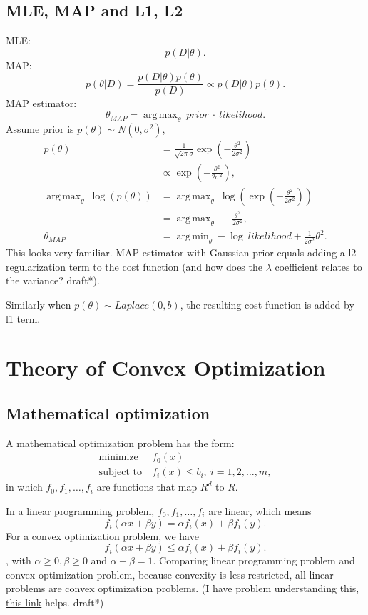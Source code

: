 \documentclass{report}
\DeclareMathOperator*{\argmax}{arg\,max}
\DeclareMathOperator*{\argmin}{arg\,min}
\begin{document}
\section{MLE, MAP and L1, L2}
MLE: \[
	p(D|\theta)
.\] 
MAP:
\[
	p(\theta|D) = \frac{p(D|\theta)p(\theta)}{p(D)} \propto p(D|\theta)p(\theta)
.\] 
MAP estimator: \[
	\theta_{MAP} = \argmax_{\theta}\ prior\ \cdot\ likelihood
.\] 
Assume prior is $p(\theta) \sim N(0, \sigma^2)$,
\begin{align*}
	p(\theta) &= \frac{1}{\sqrt{2\pi} \sigma} \exp \left( -\frac{\theta^2}{2\sigma^2} \right) \\
		  &\propto \exp \left( -\frac{
		  \theta^2}{2\sigma^2} \right), \\
		  \argmax_{\theta}\ \log(p(\theta)) &= \argmax_{\theta}\ \log \left( \exp \left( -\frac{\theta^2}{2\sigma^2} \right) \right) \\ 
 &= \argmax_{\theta}\ -\frac{\theta^2}{2\sigma^2}, \\
		  \theta_{MAP} &= \argmin_{\theta} - \log \ likelihood +  \frac{1}{2\sigma^2} \theta^2
.\end{align*}
This looks very familiar. MAP estimator with Gaussian prior equals adding a l2 regularization term to the cost function (and how does the $\lambda$ coefficient relates to the variance? draft*).

Similarly when $p(\theta) \sim Laplace(0, b)$, the resulting cost function is added by l1 term.
\chapter{Theory of Convex Optimization}
\section{Mathematical optimization}
A mathematical optimization problem has the form:
\begin{align*}
	\text{minimize}\ &f_0(x) \\
	\text{subject to}\ &f_i(x) \le  b_i,\ i = 1,2,\ldots,m,
\end{align*}
in which $f_0, f_1, \ldots, f_i$ are functions that map $R^d$ to $R$.

In a linear programming problem,  $f_0, f_1, \ldots, f_i$ are linear, which means \[
	f_i(\alpha x + \beta y) = \alpha f_i(x) + \beta f_i(y).
\] For a convex optimization problem, we have \[
	f_i(\alpha x + \beta y) \le  \alpha f_i(x) + \beta f_i(y)
.\] , with $\alpha \ge 0, \beta \ge 0$ and $\alpha + \beta = 1$.
Comparing linear programming problem and convex optimization problem, because convexity is less restricted, all linear problems are convex optimization problems. (I have problem understanding this, \href{https://math.stackexchange.com/q/4231709/727493}{this link} helps. draft*)
\end{document}
